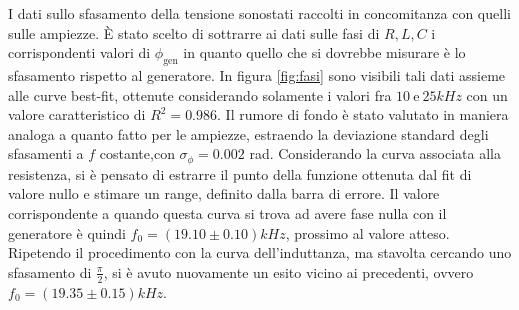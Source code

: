 I dati sullo sfasamento della tensione sonostati raccolti in concomitanza con quelli sulle ampiezze. È stato scelto di
sottrarre ai dati sulle fasi di $R, L , C$ i corrispondenti valori di $\phi_{\text{gen}}$ in quanto quello che
si dovrebbe misurare è lo sfasamento rispetto al generatore.
In figura \ref{fig:fasi} sono visibili tali dati assieme alle curve best-fit, ottenute considerando solamente i valori
fra $10  \ \text{e} \ 25 kHz$ con un valore caratteristico di $R^2 = 0.986$. Il rumore di fondo è stato valutato in
maniera analoga a quanto fatto per le ampiezze, estraendo la deviazione standard degli sfasamenti a $f$ costante,con
$\sigma_{\phi} = 0.002$ rad.
Considerando la curva associata alla resistenza, si è pensato di estrarre il punto della funzione ottenuta dal
fit di valore nullo e stimare un range, definito dalla barra di errore. Il valore corrispondente a quando questa curva si trova ad avere fase nulla con il generatore
è quindi $f_0 = (19.10 \pm 0.10)kHz$, prossimo al valore atteso. Ripetendo il procedimento con la curva dell’induttanza,
ma stavolta cercando uno sfasamento di $\frac{\pi}{2}$, si è avuto nuovamente un esito vicino ai precedenti, ovvero
$f_0 = (19.35 \pm 0.15)kHz$.






















